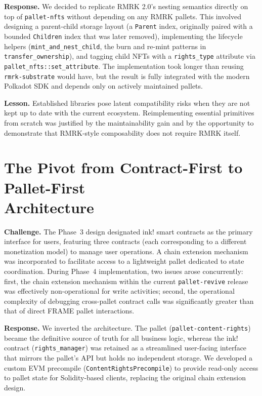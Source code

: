 \textbf{Response.} We decided to replicate RMRK 2.0's nesting semantics directly on top of \texttt{pallet-nfts} without depending on any RMRK pallets. This involved designing a parent-child storage layout (a \texttt{Parent} index, originally paired with a bounded \texttt{Children} index that was later removed), implementing the lifecycle helpers (\texttt{mint\_and\_nest\_child}, the burn and re-mint patterns in \texttt{transfer\_ownership}), and tagging child NFTs with a \texttt{rights\_type} attribute via \texttt{pallet\_nfts::set\_attribute}. The implementation took longer than reusing \texttt{rmrk-substrate} would have, but the result is fully integrated with the modern Polkadot SDK and depends only on actively maintained pallets.

\textbf{Lesson.} Established libraries pose latent compatibility risks when they are not kept up to date with the current ecosystem. Reimplementing essential primitives from scratch was justified by the maintainability gain and by the opportunity to demonstrate that RMRK-style composability does not require RMRK itself.

\section[Contract-First to Pallet-First Pivot]{The Pivot from Contract-First to Pallet-First\texorpdfstring{\\}{ }Architecture}\label{sec:contract-first-pivot}

\textbf{Challenge.} The Phase~3 design designated ink! smart contracts as the primary interface for users, featuring three contracts (each corresponding to a different monetization model) to manage user operations. A chain extension mechanism was incorporated to facilitate access to a lightweight pallet dedicated to state coordination. During Phase~4 implementation, two issues arose concurrently: first, the chain extension mechanism within the current \texttt{pallet-revive} release was effectively non-operational for write activities; second, the operational complexity of debugging cross-pallet contract calls was significantly greater than that of direct FRAME pallet interactions.

\textbf{Response.} We inverted the architecture. The pallet (\texttt{pallet-content-rights}) became the definitive source of truth for all business logic, whereas the ink! contract (\texttt{rights\_manager}) was retained as a streamlined user-facing interface that mirrors the pallet's API but holds no independent storage. We developed a custom EVM precompile (\texttt{ContentRightsPrecompile}) to provide read-only access to pallet state for Solidity-based clients, replacing the original chain extension design.

